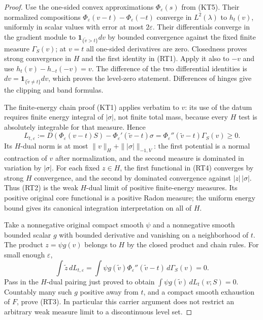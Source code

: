\documentclass[11pt,a4paper]{article}
\numberwithin{equation}{section}
\theoremstyle{definition}
\theoremstyle{remark}
\begin{document}
\begin{proof}
Use the one-sided convex approximations
$\Phi_\varepsilon(s)$ from (KT5).  Their normalized compositions
$\Phi_\varepsilon(v-t)-\Phi_\varepsilon(-t)$ converge in $L^2(\lambda)$
to $h_t(v)$, uniformly in scalar values with error at most
$2\varepsilon$.  Their differentials converge in the gradient
module to $\mathbf1_{\{\widetilde v>t\}}dv$ by bounded convergence
against the fixed finite measure $\Gamma_S(v)$; at $v=t$ all
one-sided derivatives are zero.  Closedness proves strong
convergence in $H$ and the first identity in (RT1).
Apply it also to $-v$ and use
$h_t(v)-h_{-t}(-v)=v$.  The difference of the two differential
identities is $dv=\mathbf1_{\{\widetilde v\ne t\}}dv$,
which proves the level-zero statement.
Differences of hinges give the clipping and band formulas.

The finite-energy chain proof (KT1) applies verbatim to $v$:
its use of the datum requires finite energy integral of
$|\sigma|$, not finite total mass, because every $H$ test is
absolutely integrable for that measure.  Hence
\[
 L_{t,\varepsilon}
 :=D(\Phi_\varepsilon(v-t)S)
                  -\Phi_\varepsilon'(\widetilde v-t)\sigma
   =\Phi_\varepsilon''(\widetilde v-t)\Gamma_S(v)\ge0.
 \tag{RT4}
\]
Its $H$-dual norm is at most
$\|v\|_H+\||\sigma|\|_{-1,V}$: the first potential is a
normal contraction of $v$ after normalization, and the second
measure is dominated in variation by $|\sigma|$.
For each fixed $z\in H$, the first functional in (RT4)
converges by strong $H$ convergence, and the second by dominated
convergence against $|z|\,|\sigma|$.  Thus (RT2) is the weak
$H$-dual limit of positive finite-energy measures.  Its
positive original core functional is a positive Radon measure;
the uniform energy bound gives its canonical integration
interpretation on all of $H$.

Take a nonnegative original compact smooth $\psi$ and a
nonnegative smooth bounded scalar $g$ with bounded derivative
and vanishing on a neighborhood of $t$.
The product $z=\psi g(v)$ belongs to $H$ by the closed
product and chain rules.  For small enough $\varepsilon$,
\[
 \int \widetilde z\,dL_{t,\varepsilon}
  =\int\psi g(\widetilde v)
           \Phi_\varepsilon''(\widetilde v-t)\,d\Gamma_S(v)=0.
\]
Pass in the $H$-dual pairing just proved to obtain
$\int\psi g(\widetilde v)\,dL_t(v;S)=0$.
Countably many such $g$ positive away from $t$, and a compact
smooth exhaustion of $F$, prove (RT3).  In particular this
carrier argument does not restrict an arbitrary weak measure
limit to a discontinuous level set.
\end{proof}
\end{document}
